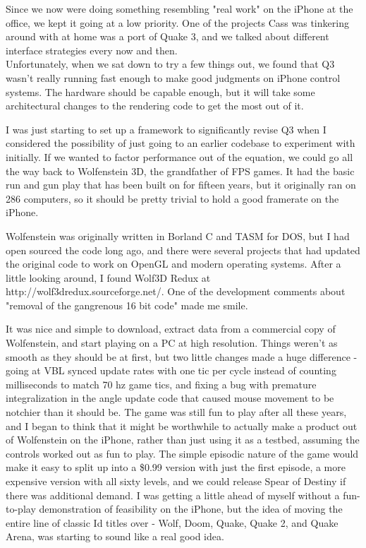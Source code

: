 \documentclass[book.tex]{subfiles}
\begin{document}
Since we now were doing something resembling "real work" on the iPhone at the office, we kept it going at a low priority.  One of the projects Cass was tinkering around with at home was a port of Quake 3, and we talked about different interface strategies every now and then.\\
Unfortunately, when we sat down to try a few things out, we found that Q3 wasn't really running fast enough to make good judgments on iPhone control systems.  The hardware should be capable enough, but it will take some architectural changes to the rendering code to get the most out of it.\\
\par

I was just starting to set up a framework to significantly revise Q3 when I considered the possibility of just going to an earlier codebase to experiment with initially.  If we wanted to factor performance out of the equation, we could go all the way back to Wolfenstein 3D, the grandfather of FPS games.  It had the basic run and gun play that has been built on for fifteen years, but it originally ran on 286 computers, so it should be pretty trivial to hold a good framerate on the iPhone.\\
\par

Wolfenstein was originally written in Borland C and TASM for DOS, but I had open sourced the code long ago, and there were several projects that had updated the original code to work on OpenGL and modern operating systems.  After a little looking around, I found Wolf3D Redux at http://wolf3dredux.sourceforge.net/.  One of the development comments about "removal of the gangrenous 16 bit code" made me smile.\\
\par

It was nice and simple to download, extract data from a commercial copy of Wolfenstein, and start playing on a PC at high resolution.  Things weren't as smooth as they should be at first, but two little changes made a huge difference - going at VBL synced update rates with one tic per cycle instead of counting milliseconds to match 70 hz game tics, and fixing a bug with premature integralization in the angle update code that caused mouse movement to be notchier than it should be.  The game was still fun to play after all these years, and I began to think that it might be worthwhile to actually make a product out of Wolfenstein on the iPhone, rather than just using it as a testbed, assuming the controls worked out as fun to play.  The simple episodic nature of the game would make it easy to split up into a \$0.99 version with just the first episode, a more expensive version with all sixty levels, and we could release Spear of Destiny if there was additional demand.  I was getting a little ahead of myself without a fun-to-play demonstration of feasibility on the iPhone, but the idea of moving the entire line of classic Id titles over - Wolf, Doom, Quake, Quake 2, and Quake Arena, was starting to sound like a real good idea.\\
\par
\end{document}
